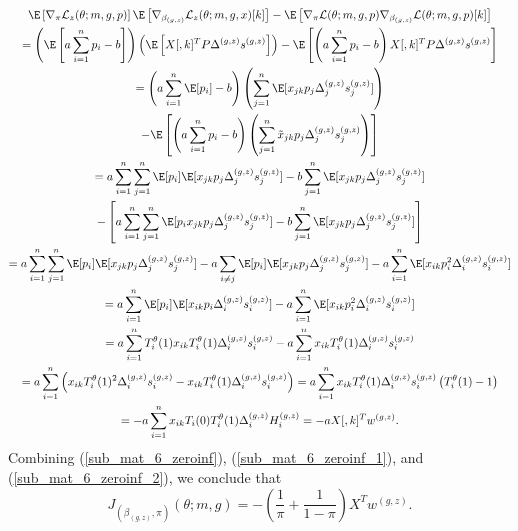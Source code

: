 \documentclass[12pt]{article}
\begin{document}
\begin{appendices}
\begin{multline}
\E \left[ \nabla_\pi \mathcal{L}_z(\theta; m, g, p) \right] \E\left[\nabla_{\beta_{(g,z)}} \mathcal{L}_z(\theta; m, g, x)[k] \right] - \E \left[\nabla_{\pi}\mathcal{L}(\theta; m,g,p) \nabla_{\beta_{(g,z)}} \mathcal{L} (\theta; m,g,p)[k] \right] \\= \left(\E \left[ a \sum_{i=1}^n p_i - b \right] \right)\left( \E \left[{X}[,k]^T P \Delta^{(g,z)} s^{(g,z)} \right]\right) - \E \left[ \left( a \sum_{i=1}^n p_i - b \right) {X}[,k]^T P \Delta^{(g,z)} s^{(g,z)}\right] \\ = \left( a \sum_{i=1}^n \E[p_i] - b \right) \left( \sum_{j=1}^n \E [x_{jk} p_j \Delta^{(g,z)}_j s^{(g,z)}_j] \right) \\ - \E \left[ \left( a \sum_{i=1}^n p_i - b \right) \left( \sum_{j=1}^n \tilde{x}_{jk} p_j \Delta^{(g,z)}_j s^{(g,z)}_j \right) \right] \\= a \sum_{i=1}^n \sum_{j=1}^n \E [p_i] \E[x_{jk} p_j \Delta^{(g,z)}_j s^{(g,z)}_j] - b \sum_{j=1}^n \E[x_{jk} p_j \Delta^{(g,z)}_j s^{(g,z)}_j] \\ - \left[a \sum_{i=1}^n \sum_{j=1}^n \E [ p_i x_{jk} p_j \Delta^{(g,z)}_j s^{(g,z)}_j] - b \sum_{j=1}^n \E[x_{jk} p_j \Delta^{(g,z)}_j s^{(g,z)}_j] \right] \\ = a \sum_{i=1}^n \sum_{j=1}^n \E[p_i] \E[{x}_{jk} p_j \Delta^{(g,z)}_j s^{(g,z)}_j] - a \sum_{i \neq j} \E[p_i] \E[x_{jk} p_j \Delta^{(g,z)}_j s^{(g,z)}_j] - a \sum_{i=1}^n \E[ x_{ik} p_i^2 \Delta^{(g,z)}_i s^{(g,z)}_i] \\ = a \sum_{i=1}^n \E[p_i] \E[x_{ik} p_i \Delta^{(g,z)}_i s^{(g,z)}_i] - a \sum_{i=1}^n \E[x_{ik} p_i^2 \Delta^{(g,z)}_i s^{(g,z)}_i] \\ = a \sum_{i=1}^n T^\theta_i(1) x_{ik} T^\theta_i(1) \Delta^{(g,z)}_i s^{(g,z)}_i - a \sum_{i=1}^n x_{ik} T^\theta_i(1) \Delta^{(g,z)}_i s^{(g,z)}_i \\ = a \sum_{i=1}^n \left( {x}_{ik} T^\theta_i(1)^2 \Delta^{(g,z)}_i s^{(g,z)}_i - x_{ik} T^\theta_i(1) \Delta^{(g,z)}_i s^{(g,z)}_i \right) = a \sum_{i=1}^n {x}_{ik}T^\theta_i(1)\Delta^{(g,z)}_i s^{(g,z)}_i \left( T^\theta_i(1) - 1\right) \\ = -a\sum_{i=1}^n x_{ik} T_i(0) T^\theta_i(1)\Delta^{(g,z)}_i H^{(g,z)}_i = -a X[,k]^T w^{(g,z)}.
\end{multline}
Combining (\ref{sub_mat_6_zeroinf}), (\ref{sub_mat_6_zeroinf_1}), and (\ref{sub_mat_6_zeroinf_2}), we conclude that
\begin{equation}\label{sub_mat_6_zeroinf_formula} J_{(\beta_{(g,z)},\pi)}(\theta; m, g) = -\left( \frac{1}{\pi} + \frac{1}{1-\pi} \right)X^T w^{(g,z)}.\end{equation}


\end{appendices}
\end{document}
